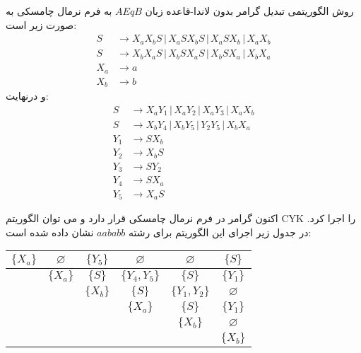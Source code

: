 \documentclass[main.tex]{subfiles}
\begin{document}
\begin{example}
روش الگوریتمی تبدیل گرامر بدون لاندا-قاعده زبان 
$AEqB$
به فرم نرمال چامسکی به صورت زیر است:
 		\begin{align*}
 	S &\rightarrow X_aX_bS \, | \, X_aSX_bS \, | \, X_aSX_b \, | \, X_aX_b \\
 	S &\rightarrow X_bX_aS \, | \, X_bSX_aS \, | \, X_bSX_a \, | \, X_bX_a \\
 	 X_a &\rightarrow a \\
 	X_b &\rightarrow b
 \end{align*}
و درنهایت: 
 		\begin{align*}
 	S &\rightarrow X_aY_1 \, | \, X_aY_2 \, | \, X_aY_3 \, | \, X_aX_b \\
 	S &\rightarrow X_bY_4 \, | \, X_bY_5 \, | \, Y_2Y_5 \, | \, X_bX_a \\
 	Y_1 &\rightarrow SX_b \\
 	Y_2 &\rightarrow X_bS \\
 	Y_3 &\rightarrow SY_2 \\
 	Y_4 &\rightarrow SX_a \\
 	Y_5 &\rightarrow X_aS
 \end{align*}

اکنون گرامر در فرم نرمال چامسکی قرار دارد و می توان الگوریتم CYK را اجرا کرد. در جدول زیر اجرای این الگوریتم برای رشته 
$aababb$
نشان داده شده است:
\setLTR
	\begin{center}
		\begin{tabular}{|c|c|c|c|c|c|}
			\hline
			$\{X_a\}$ & $\varnothing$ & $\{Y_5\}$ & $\varnothing$ & $\varnothing$ & $\{S\}$ \\
			\hline
			& $\{X_a\}$ & $\{S\}$ & $\{Y_4, Y_5\}$ & $\{S\}$ & $\{Y_1\}$ \\
			\hline
			&  & $\{X_b\}$ & $\{S\}$ & $\{Y_1, Y_2\}$ & $\varnothing$ \\
			\hline
			& & & $\{X_a\}$ & $\{S\}$ & $\{Y_1\}$ \\
			\hline
			&  &  &  & $\{X_b\}$ & $\varnothing$ \\
			\hline
			&  & &  &  & $\{X_b\}$ \\
			\hline
		\end{tabular}
	\end{center}
\setRTL

	\end{example}
\end{document}
